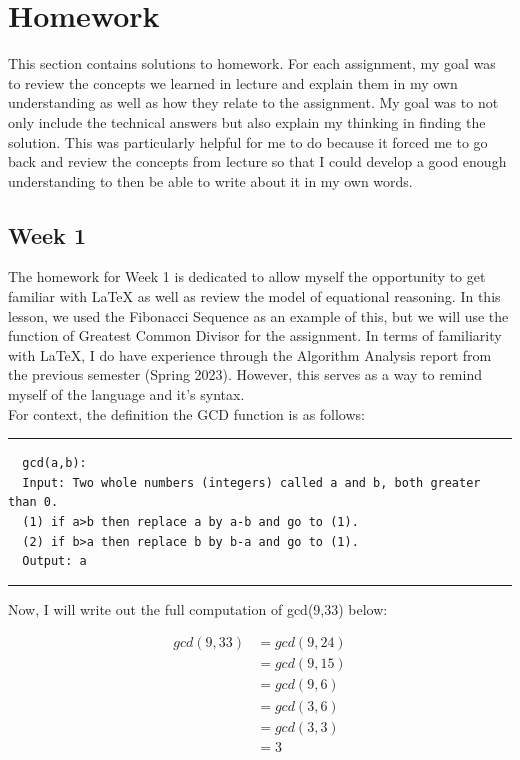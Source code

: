 \documentclass{article}
\theoremstyle{theorem}
\theoremstyle{definition}
\theoremstyle{remark}
\begin{document}
\section{Homework}\label{homework}
This section contains solutions to homework. For each assignment, my goal was to review the concepts we learned in lecture and explain them in my own understanding 
as well as how they relate to the assignment. My goal was to not only include the technical answers but also explain my thinking in finding the solution. This was 
particularly helpful for me to do because it forced me to go back and review the concepts from lecture so that I could develop a good enough understanding to then 
be able to write about it in my own words. 


\subsection{Week 1}

The homework for Week 1 is dedicated to allow myself the opportunity to get familiar with LaTeX as well as review the model of equational reasoning. 
In this lesson, we used the Fibonacci Sequence as an example of this, but we will use the function of Greatest Common Divisor for the assignment.
In terms of familiarity with LaTeX, I do have experience through the Algorithm Analysis report from the previous 
semester (Spring 2023). However, this serves as a way to remind myself of the language and it's syntax. \\


For context, the definition the GCD function is as follows:\\
\noindent
  {\color{gray} \rule{\linewidth}{0.05mm}}
\begin{center}
  \begin{verbatim}
  gcd(a,b): 
  Input: Two whole numbers (integers) called a and b, both greater than 0.
  (1) if a>b then replace a by a-b and go to (1).
  (2) if b>a then replace b by b-a and go to (1).
  Output: a
  \end{verbatim}
\end{center}
\noindent
  {\color{gray} \rule{\linewidth}{0.05mm}}

Now, I will write out the full computation of gcd(9,33) below:

\begin{align*}
  gcd(9,33) & = gcd(9,24)\\
            & = gcd(9,15)\\
            & = gcd(9,6)\\
            & = gcd(3,6)\\
            & = gcd(3,3)\\
            & = 3
\end{align*}
\end{document}
